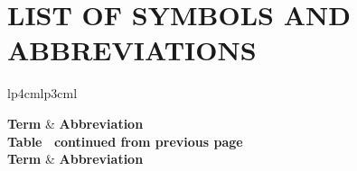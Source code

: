 \chapter*{LIST OF SYMBOLS AND ABBREVIATIONS}

{\singlespacing
	\begin{longtable}{lp{4cm}lp{3cm}l}

		\hline
		\textbf{Term}                                & \textbf{Abbreviation}    \\ \hline
		\endfirsthead
		{{\bfseries Table \thetable\ continued from previous page}} \\

		\hline
		\textbf{Term}                                & \textbf{Abbreviation}  \\ \hline
		\endhead


\end{longtable}}
